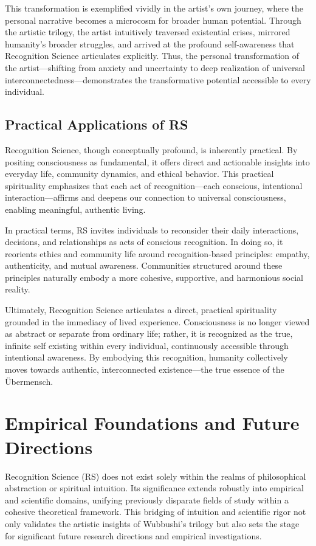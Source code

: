 \documentclass[12pt]{article}
\begin{document}
This transformation is exemplified vividly in the artist’s own journey, where the personal narrative becomes a microcosm for broader human potential. Through the artistic trilogy, the artist intuitively traversed existential crises, mirrored humanity’s broader struggles, and arrived at the profound self-awareness that Recognition Science articulates explicitly. Thus, the personal transformation of the artist—shifting from anxiety and uncertainty to deep realization of universal interconnectedness—demonstrates the transformative potential accessible to every individual.

\subsection{Practical Applications of RS}

Recognition Science, though conceptually profound, is inherently practical. By positing consciousness as fundamental, it offers direct and actionable insights into everyday life, community dynamics, and ethical behavior. This practical spirituality emphasizes that each act of recognition—each conscious, intentional interaction—affirms and deepens our connection to universal consciousness, enabling meaningful, authentic living.

In practical terms, RS invites individuals to reconsider their daily interactions, decisions, and relationships as acts of conscious recognition. In doing so, it reorients ethics and community life around recognition-based principles: empathy, authenticity, and mutual awareness. Communities structured around these principles naturally embody a more cohesive, supportive, and harmonious social reality.

Ultimately, Recognition Science articulates a direct, practical spirituality grounded in the immediacy of lived experience. Consciousness is no longer viewed as abstract or separate from ordinary life; rather, it is recognized as the true, infinite self existing within every individual, continuously accessible through intentional awareness. By embodying this recognition, humanity collectively moves towards authentic, interconnected existence—the true essence of the Übermensch.

\section{Empirical Foundations and Future Directions}

Recognition Science (RS) does not exist solely within the realms of philosophical abstraction or spiritual intuition. Its significance extends robustly into empirical and scientific domains, unifying previously disparate fields of study within a cohesive theoretical framework. This bridging of intuition and scientific rigor not only validates the artistic insights of Wubbushi’s trilogy but also sets the stage for significant future research directions and empirical investigations.
\end{document}
